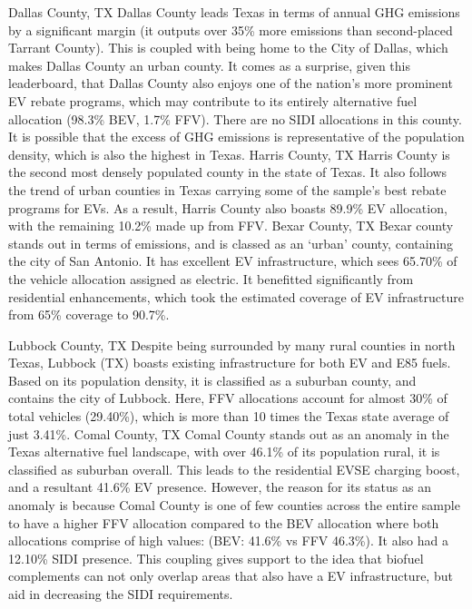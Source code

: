 \documentclass[answers]{exam}
\begin{document}
\begin{outline}
\1 Dallas County, TX
\2 Dallas County leads Texas in terms of annual GHG emissions by a significant margin (it outputs over 35\% more emissions than second-placed Tarrant County). This is coupled with being home to the City of Dallas, which makes Dallas County an urban county. It comes as a surprise, given this leaderboard, that Dallas County also enjoys one of the nation's more prominent EV rebate programs, which may contribute to its entirely alternative fuel allocation (98.3\% BEV, 1.7\% FFV). There are no SIDI allocations in this county. It is possible that the excess of GHG emissions is representative of the population density, which is also the highest in Texas.
\1 Harris County, TX
\2 Harris County is the second most densely populated county in the state of Texas. It also follows the trend of urban counties in Texas carrying some of the sample's best rebate programs for EVs. As a result, Harris County also boasts 89.9\% EV allocation, with the remaining 10.2\% made up from FFV. 
\1 Bexar County, TX
\2 Bexar county stands out in terms of emissions, and is classed as an `urban' county, containing the city of San Antonio. It has excellent EV infrastructure, which sees 65.70\% of the vehicle allocation assigned as electric. It benefitted significantly from residential enhancements, which took the estimated coverage of EV infrastructure from 65\% coverage to 90.7\%.

\1 Lubbock County, TX
\2 Despite being surrounded by many rural counties in north Texas, Lubbock (TX) boasts existing infrastructure for both EV and E85 fuels. Based on its population density, it is classified as a suburban county, and contains the city of Lubbock. Here, FFV allocations account for almost 30\% of total vehicles (29.40\%), which is more than 10 times the Texas state average of just 3.41\%.
\1 Comal County, TX
\2 Comal County stands out as an anomaly in the Texas alternative fuel landscape, with over 46.1\% of its population rural, it is classified as suburban overall. This leads to the residential EVSE charging boost, and a resultant 41.6\% EV presence. However, the reason for its status as an anomaly is because Comal County is one of few counties across the entire sample to have a higher FFV allocation compared to the BEV allocation where both allocations comprise of high values: (BEV: 41.6\% vs FFV 46.3\%). It also had a 12.10\% SIDI presence. This coupling gives support to the idea that biofuel complements can not only overlap areas that also have a EV infrastructure, but aid in decreasing the SIDI requirements.
\end{outline}
\end{document}
